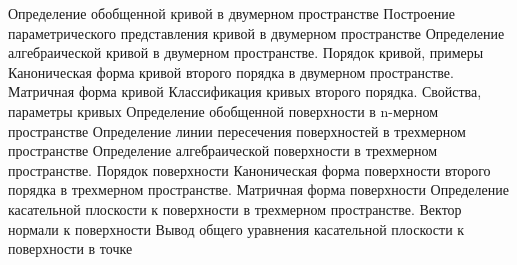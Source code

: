 Определение обобщенной кривой в двумерном пространстве
Построение параметрического представления кривой в двумерном пространстве
Определение алгебраической кривой в двумерном пространстве. Порядок кривой, примеры
Каноническая форма кривой второго порядка в двумерном пространстве. Матричная форма кривой
Классификация кривых второго порядка. Свойства, параметры кривых
Определение обобщенной поверхности в n-мерном пространстве
Определение линии пересечения поверхностей в трехмерном пространстве
Определение алгебраической поверхности в трехмерном пространстве. Порядок поверхности
Каноническая форма поверхности второго порядка в трехмерном пространстве. Матричная форма поверхности
Определение касательной плоскости к поверхности в трехмерном пространстве. Вектор нормали к поверхности
Вывод общего уравнения касательной плоскости к поверхности в точке